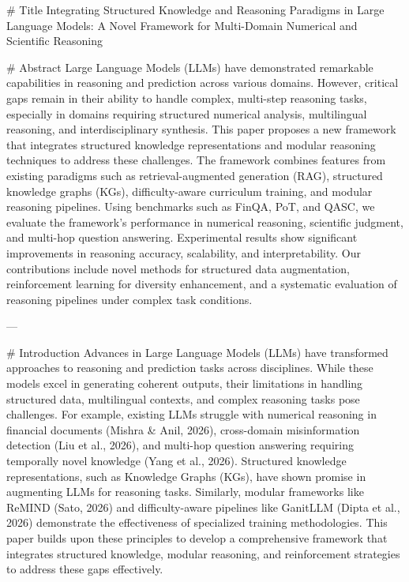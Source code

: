 # Title  
Integrating Structured Knowledge and Reasoning Paradigms in Large Language Models: A Novel Framework for Multi-Domain Numerical and Scientific Reasoning  

# Abstract  
Large Language Models (LLMs) have demonstrated remarkable capabilities in reasoning and prediction across various domains. However, critical gaps remain in their ability to handle complex, multi-step reasoning tasks, especially in domains requiring structured numerical analysis, multilingual reasoning, and interdisciplinary synthesis. This paper proposes a new framework that integrates structured knowledge representations and modular reasoning techniques to address these challenges. The framework combines features from existing paradigms such as retrieval-augmented generation (RAG), structured knowledge graphs (KGs), difficulty-aware curriculum training, and modular reasoning pipelines. Using benchmarks such as FinQA, PoT, and QASC, we evaluate the framework's performance in numerical reasoning, scientific judgment, and multi-hop question answering. Experimental results show significant improvements in reasoning accuracy, scalability, and interpretability. Our contributions include novel methods for structured data augmentation, reinforcement learning for diversity enhancement, and a systematic evaluation of reasoning pipelines under complex task conditions.  

---

# Introduction  
Advances in Large Language Models (LLMs) have transformed approaches to reasoning and prediction tasks across disciplines. While these models excel in generating coherent outputs, their limitations in handling structured data, multilingual contexts, and complex reasoning tasks pose challenges. For example, existing LLMs struggle with numerical reasoning in financial documents (Mishra & Anil, 2026), cross-domain misinformation detection (Liu et al., 2026), and multi-hop question answering requiring temporally novel knowledge (Yang et al., 2026). Structured knowledge representations, such as Knowledge Graphs (KGs), have shown promise in augmenting LLMs for reasoning tasks. Similarly, modular frameworks like ReMIND (Sato, 2026) and difficulty-aware pipelines like GanitLLM (Dipta et al., 2026) demonstrate the effectiveness of specialized training methodologies. This paper builds upon these principles to develop a comprehensive framework that integrates structured knowledge, modular reasoning, and reinforcement strategies to address these gaps effectively.  


